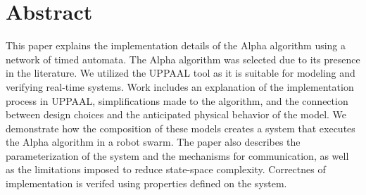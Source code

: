 \section{Abstract}
This paper explains the implementation details of the Alpha algorithm using a network of timed automata. The Alpha algorithm was selected due to its presence in the literature. We utilized the UPPAAL tool as it is suitable for modeling and verifying real-time systems. Work includes an explanation of the implementation process in UPPAAL, simplifications made to the algorithm, and the connection between design choices and the anticipated physical behavior of the model. We demonstrate how the composition of these models creates a system that executes the Alpha algorithm in a robot swarm. The paper also describes the parameterization of the system and the mechanisms for communication, as well as the limitations imposed to reduce state-space complexity. Correctnes of implementation is verifed using properties defined on the system.
